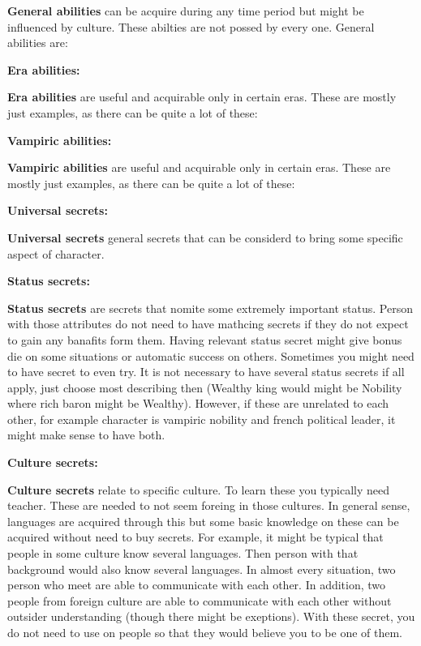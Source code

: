 \documentclass[a4paper, 12pt, finnish]{report}
\begin{document}
\textbf{General abilities} can be acquire during any time period but might be influenced by culture. These abilties are not possed by every one. General abilities are: \GeneralAbilityName{}

\cols{
\GeneralAbility{}
}

\pagebreak

\textbf{Era abilities:}

\textbf{Era abilities} are useful and acquirable only in certain eras. These are mostly just examples, as there can be quite a lot of these: \EraAbilityName{}

\cols{
\EraAbility{}
}

\pagebreak

\textbf{Vampiric abilities:}

\textbf{Vampiric abilities} are useful and acquirable only in certain eras. These are mostly just examples, as there can be quite a lot of these: \VampiricAbilityName{}

\cols{
\VampiricAbility{}
}

\pagebreak


\textbf{Universal secrets:}

\textbf{Universal secrets} general secrets that can be considerd to bring some specific aspect of character.

\cols{
\UniversalSecret{}
}

\textbf{Status secrets:}

\textbf{Status secrets} are secrets that nomite some extremely important status. 
Person with those attributes do not need to have mathcing secrets if they do not expect to gain any banafits form them.
Having relevant status secret might give bonus die on some situations or automatic success on others.
Sometimes you might need to have secret to even try.
It is not necessary to have several status secrets if all apply, just choose most describing then (Wealthy king would might be Nobility where rich baron might be Wealthy).
However, if these are unrelated to each other, for example character is vampiric nobility and french political leader, it might make sense to have both.

\cols{
\StatusSecret{}
}


\textbf{Culture secrets:}

\textbf{Culture secrets} relate to specific culture.
To learn these you typically need teacher.
These are needed to not seem foreing in those cultures.
In general sense, languages are acquired through this but some basic knowledge on these can be acquired without need to buy secrets.
For example, it might be typical that people in some culture know several languages.
Then person with that background would also know several languages.
In almost every situation, two person who meet are able to communicate with each other.
In addition, two people from foreign culture are able to communicate with each other without outsider understanding (though there might be exeptions).
With these secret, you do not need to use \AbilityNameDeceit{} on people so that they would believe you to be one of them.
\end{document}
